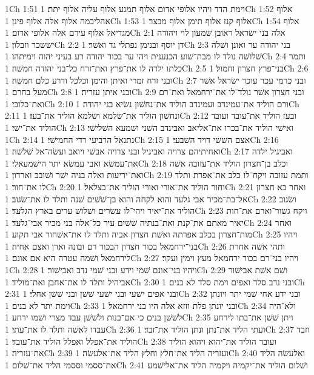 1Ch 1:51  וימת הדד ויהיו אלופי אדום אלוף תמנע אלוף עליה אלוף יתת׃
1Ch 1:52  אלוף אהליבמה אלוף אלה אלוף פינן׃
1Ch 1:53  אלוף קנז אלוף תימן אלוף מבצר׃
1Ch 1:54  אלוף מגדיאל אלוף עירם אלה אלופי אדום׃
1Ch 2:1  אלה בני ישׂראל ראובן שׁמעון לוי ויהודה ישׂשכר וזבלון׃
1Ch 2:2  דן יוסף ובנימן נפתלי גד ואשׁר׃
1Ch 2:3  בני יהודה ער ואונן ושׁלה שׁלושׁה נולד לו מבת־שׁוע הכנענית ויהי ער בכור יהודה רע בעיני יהוה וימיתהו׃
1Ch 2:4  ותמר כלתו ילדה לו את־פרץ ואת־זרח כל־בני יהודה חמשׁה׃
1Ch 2:5  בני־פרץ חצרון וחמול׃
1Ch 2:6  ובני זרח זמרי ואיתן והימן וכלכל ודרע כלם חמשׁה׃
1Ch 2:7  ובני כרמי עכר עוכר ישׂראל אשׁר מעל בחרם׃
1Ch 2:8  ובני איתן עזריה׃
1Ch 2:9  ובני חצרון אשׁר נולד־לו את־ירחמאל ואת־רם ואת־כלובי׃
1Ch 2:10  ורם הוליד את־עמינדב ועמינדב הוליד את־נחשׁון נשׂיא בני יהודה׃
1Ch 2:11  ונחשׁון הוליד את־שׂלמא ושׂלמא הוליד את־בעז׃
1Ch 2:12  ובעז הוליד את־עובד ועובד הוליד את־ישׁי׃
1Ch 2:13  ואישׁי הוליד את־בכרו את־אליאב ואבינדב השׁני ושׁמעא השׁלישׁי׃
1Ch 2:14  נתנאל הרביעי רדי החמישׁי׃
1Ch 2:15  אצם השׁשׁי דויד השׁבעי׃
1Ch 2:16  ואחיתיהם צרויה ואביגיל ובני צרויה אבשׁי ויואב ועשׂה־אל שׁלשׁה׃
1Ch 2:17  ואביגיל ילדה את־עמשׂא ואבי עמשׂא יתר הישׁמעאלי׃
1Ch 2:18  וכלב בן־חצרון הוליד את־עזובה אשׁה ואת־יריעות ואלה בניה ישׁר ושׁובב וארדון׃
1Ch 2:19  ותמת עזובה ויקח־לו כלב את־אפרת ותלד לו את־חור׃
1Ch 2:20  וחור הוליד את־אורי ואורי הוליד את־בצלאל׃
1Ch 2:21  ואחר בא חצרון אל־בת־מכיר אבי גלעד והוא לקחה והוא בן־שׁשׁים שׁנה ותלד לו את־שׂגוב׃
1Ch 2:22  ושׂגוב הוליד את־יאיר ויהי־לו עשׂרים ושׁלושׁ ערים בארץ הגלעד׃
1Ch 2:23  ויקח גשׁור־וארם את־חות יאיר מאתם את־קנת ואת־בנתיה שׁשׁים עיר כל־אלה בני מכיר אבי־גלעד׃
1Ch 2:24  ואחר מות־חצרון בכלב אפרתה ואשׁת חצרון אביה ותלד לו את־אשׁחור אבי תקוע׃
1Ch 2:25  ויהיו בני־ירחמאל בכור חצרון הבכור רם ובונה וארן ואצם אחיה׃
1Ch 2:26  ותהי אשׁה אחרת לירחמאל ושׁמה עטרה היא אם אונם׃
1Ch 2:27  ויהיו בני־רם בכור ירחמאל מעץ וימין ועקר׃
1Ch 2:28  ויהיו בני־אונם שׁמי וידע ובני שׁמי נדב ואבישׁור׃
1Ch 2:29  ושׁם אשׁת אבישׁור אביהיל ותלד לו את־אחבן ואת־מוליד׃
1Ch 2:30  ובני נדב סלד ואפים וימת סלד לא בנים׃
1Ch 2:31  ובני אפים ישׁעי ובני ישׁעי שׁשׁן ובני שׁשׁן אחלי׃
1Ch 2:32  ובני ידע אחי שׁמי יתר ויונתן וימת יתר לא בנים׃
1Ch 2:33  ובני יונתן פלת וזזא אלה היו בני ירחמאל׃
1Ch 2:34  ולא־היה לשׁשׁן בנים כי אם־בנות ולשׁשׁן עבד מצרי ושׁמו ירחע׃
1Ch 2:35  ויתן שׁשׁן את־בתו לירחע עבדו לאשׁה ותלד לו את־עתי׃
1Ch 2:36  ועתי הליד את־נתן ונתן הוליד את־זבד׃
1Ch 2:37  וזבד הוליד את־אפלל ואפלל הוליד את־עובד׃
1Ch 2:38  ועובד הוליד את־יהוא ויהוא הוליד את־עזריה׃
1Ch 2:39  ועזריה הליד את־חלץ וחלץ הליד את־אלעשׂה׃
1Ch 2:40  ואלעשׂה הליד את־ססמי וססמי הליד את־שׁלום׃
1Ch 2:41  ושׁלום הוליד את־יקמיה ויקמיה הליד את־אלישׁמע׃
